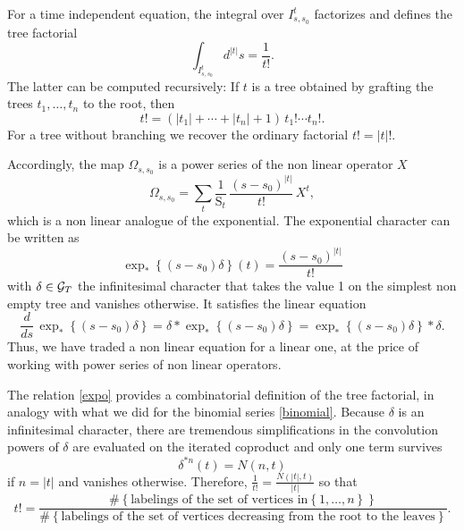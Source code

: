 \documentclass[12pt,here,feynmf]{article}
\begin{document}
For a time independent equation, the integral over $I^{t}_{s,s_{0}}$ factorizes and defines the tree factorial
\begin{equation}
\int_{I^{t}_{s,s_{0}}}d^{|t|}s=\frac{1}{t!}.
\end{equation}
The latter can be computed recursively: If $t$ is a tree obtained by grafting the trees $t_{1},\dots,t_{n}$ to the root, then
\begin{equation}
t!=\left(|t_{1}|+\cdots+|t_{n}|+1\right)\,t_{1}!\cdots t_{n}!.
\end{equation}
For a tree without branching we recover the ordinary factorial $t!=|t|!$. 



Accordingly, the map $\Omega_{s,s_{0}}$ is a power series of the non linear operator $X$
\begin{equation}
\Omega_{s,s_{0}}=\sum_{t}\frac{1}{\mathrm{S}_{t}}\,\frac{ (s-s_{0})^{|t|}}{t!}\,X^{t},
\end{equation}
which is a non linear analogue of the exponential. The exponential character can be written as 
\begin{equation}
\exp_{\ast}\left\{(s-s_{0})\delta\right\}(t)=\frac{(s-s_{0})^{|t|}}{t!}\label{expo}
\end{equation}
with $\delta\in{\cal G}_{T}$ the infinitesimal character that takes the value 1 on the simplest non empty tree and vanishes otherwise. It satisfies the linear equation
\begin{equation}
\frac{d}{ds}\,\exp_{\ast}\left\{(s-s_{0})\delta\right\}=\delta\ast \exp_{\ast}\left\{(s-s_{0})\delta\right\}=\exp_{\ast}\left\{(s-s_{0})\delta\right\}\ast\delta.
\end{equation}
Thus, we have traded a non linear equation for a linear one, at the price of working with power series of non linear operators. 

The relation \eqref{expo} provides a combinatorial definition of the tree factorial, in analogy with what we did for the binomial series \eqref{binomial}. Because $\delta$ is an infinitesimal character, there are tremendous simplifications in the convolution powers of $\delta$ are evaluated on the iterated coproduct and only one term survives
\begin{equation}
\delta^{\ast n}(t)=N(n,t)
\end{equation}
if $n=|t|$ and vanishes otherwise. Therefore, $\frac{1}{t!}=\frac{N(|t|,t)}{|t|}$ so that
\begin{equation}
t!=\frac{\#\left\{ \mbox{labelings of the set of vertices in}\left\{1,\dots,n\right\} \right\}}
{\#\left\{ \mbox{labelings of the set of vertices decreasing from the root to the leaves} \right\}}.
\label{combifac}
\end{equation}
\end{document}
